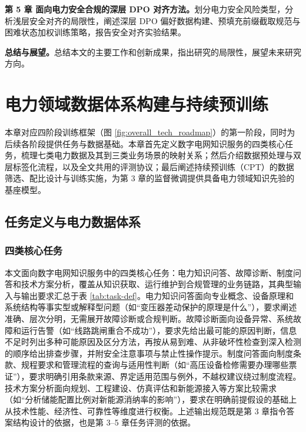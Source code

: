 \documentclass[fontset=fandol,type=master,campus=shenzhen,etitleauto=true]{hithesisbook}
\begin{document}
\textbf{第 5 章 面向电力安全合规的深层 DPO 对齐方法。}划分电力安全风险类型，分析浅层安全对齐的局限性，阐述深层 DPO 偏好数据构建、预填充前缀截取规范与困难状态加权训练策略，报告安全对齐实验结果。

\textbf{总结与展望。}总结本文的主要工作和创新成果，指出研究的局限性，展望未来研究方向。


\chapter{电力领域数据体系构建与持续预训练}\label{ux9762ux5411ux7535ux529bux77e5ux8bc6ux670dux52a1ux7684ux5927ux8bedux8a00ux6a21ux578bux603bux4f53ux6846ux67b6}

本章对应四阶段训练框架（图 \ref{fig:overall_tech_roadmap}）的第一阶段，同时为后续各阶段提供任务与数据基础。本章首先定义数字电网知识服务的四类核心任务，梳理七类电力数据及其到三类业务场景的映射关系；然后介绍数据预处理与双层标签化流程，以及全文共用的评测协议；最后阐述持续预训练（CPT）的数据筛选、配比设计与训练实施，为第 3 章的监督微调提供具备电力领域知识先验的基座模型。

\section{任务定义与电力数据体系}\label{sec:task-data}

\subsection{四类核心任务}\label{ux4efbux52a1ux5b9aux4e49}

本文面向数字电网知识服务中的四类核心任务：电力知识问答、故障诊断、制度问答和技术方案分析，覆盖从知识获取、运行维护到合规管理的业务链路，其典型输入与输出要求汇总于表 \ref{tab:task-def}。电力知识问答面向专业概念、设备原理和系统结构等事实型或解释型问题（如``变压器差动保护的原理是什么''），要求阐述准确、层次分明，无需展开故障诊断或合规判断。故障诊断面向设备异常、系统故障和运行告警（如``线路跳闸重合不成功''），要求先给出最可能的原因判断，信息不足时列出多种可能原因及区分方法，再按从易到难、从非破坏性检查到深入检测的顺序给出排查步骤，并附安全注意事项与禁止性操作提示。制度问答面向制度条款、规程要求和管理流程的查询与适用性判断（如``高压设备检修需要办理哪些票证''），要求明确引用条款来源、界定适用范围与例外，不越权建议绕过制度流程。技术方案分析面向规划、工程建设、仿真评估和新能源接入等方案比较需求（如``分析储能配置比例对新能源消纳率的影响''），要求在明确前提假设的基础上从技术性能、经济性、可靠性等维度进行权衡。上述输出规范既是第 3 章指令答案结构设计的依据，也是第 3--5 章任务评测的依据。
\end{document}
